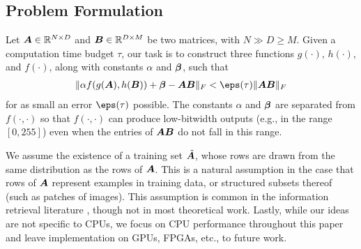 \subsection{Problem Formulation} \label{sec:problemStatement}

Let $\bm{A} \in \mathbb{R}^{N \times D}$ and $\bm{B} \in \mathbb{R}^{D \times M}$ be two matrices, with $N \gg D \ge M$. Given a computation time budget $\tau$, our task is to
construct three functions $g(\cdot)$, $h(\cdot)$, and $f(\cdot)$, along with constants $\alpha$ and $\bm{\beta}$, such that
\begin{align} \label{eq:objective}
    \norm{\alpha f(g(\A), h(\B)) + \mat{\beta} - \A\B}_F < \eps(\tau) \norm{\A\B}_F
\end{align}
for as small an error $\eps(\tau)$ possible. The constants $\alpha$ and $\bm{\beta}$ are separated from $f(\cdot,\cdot)$ so that $f(\cdot,\cdot)$ can produce low-bitwidth outputs (e.g., in the range $[0, 255]$) even when the entries of $\bm{A}\bm{B}$ do not fall in this range.

We assume the existence of a training set $\tilde{\bm{A}}$, whose rows are drawn from the same distribution as the rows of $\bm{A}$. This is a natural assumption in the case that rows of $\bm{A}$ represent examples in training data, or structured subsets thereof (such as patches of images). This assumption is common in the information retrieval literature \cite{bolt,pairq,quip}, though not in most theoretical work. Lastly, while our ideas are not specific to CPUs, we focus on CPU performance throughout this paper and leave implementation on GPUs, FPGAs, etc., to future work.

